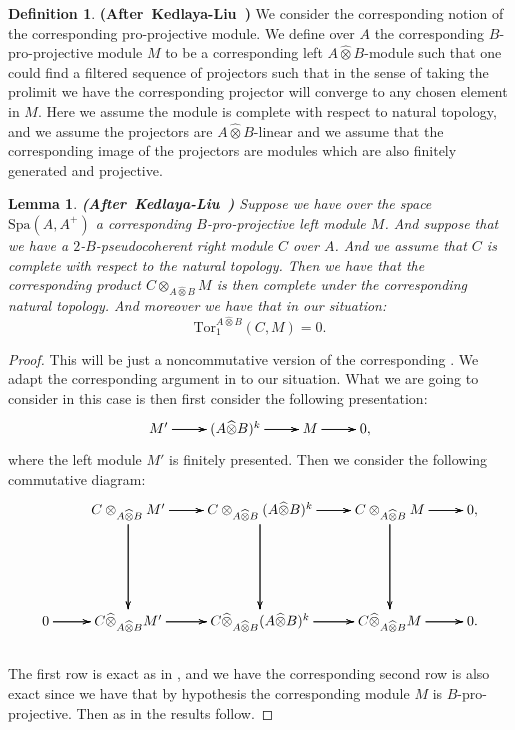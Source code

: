 \documentclass[12pt]{amsart}
\newtheorem{lemma}[theorem]{Lemma}
\theoremstyle{definition}
\newtheorem{definition}[theorem]{Definition}
\numberwithin{equation}{section}
\begin{document}
\begin{definition}\mbox{\bf{(After Kedlaya-Liu \cite[Definition 2.4.6]{KL2})}} We consider the corresponding notion of the corresponding pro-projective module. We define over $A$ the corresponding $B$-pro-projective module $M$ to be a corresponding left $A\widehat{\otimes}B$-module such that one could find a filtered sequence of projectors such that in the sense of taking the prolimit we have the corresponding projector will converge to any chosen element in $M$. Here we assume the module is complete with respect to natural topology, and we assume the projectors are $A\widehat{\otimes}B$-linear and we assume that the corresponding image of the projectors are modules which are also finitely generated and projective.
	
\end{definition}




\begin{lemma}\mbox{\bf{(After Kedlaya-Liu \cite[Lemma 2.4.7]{KL2})}}
Suppose we have over the space $\mathrm{Spa}(A,A^+)$ a corresponding $B$-pro-projective left module $M$. And suppose that we have a $2$-$B$-pseudocoherent right module $C$ over $A$. And we assume that $C$ is complete with respect to the natural topology. Then we have that the corresponding product $C{\otimes}_{A\widehat{\otimes}B}M$ is then complete under the corresponding natural topology. And moreover we have that in our situation:
\begin{displaymath}
\mathrm{Tor}_1^{A\widehat{\otimes}B}(C,M)=0.	
\end{displaymath}

\end{lemma}



\begin{proof}
This will be just a noncommutative version of the corresponding  \cite[Lemma 2.4.7]{KL2}. We adapt the corresponding argument in \cite[Lemma 2.4.7]{KL2} to our situation. What we are going to consider in this case is then first consider the following presentation:
\[
\xymatrix@C+0pc@R+0pc{
M'  \ar[r]\ar[r]\ar[r] &(A\widehat{\otimes}B)^k \ar[r]\ar[r]\ar[r] & M\ar[r]\ar[r]\ar[r] &0,
}
\]
where the left module $M'$ is finitely presented. Then we consider the following commutative diagram:
\[
\xymatrix@C+0pc@R+3pc{
&C\otimes_{A\widehat{\otimes}B}M'  \ar[r]\ar[r]\ar[r]  \ar[d]\ar[d]\ar[d] &C\otimes_{A\widehat{\otimes}B}(A\widehat{\otimes}B)^k \ar[r]\ar[r]\ar[r] \ar[d]\ar[d]\ar[d] & C\otimes_{A\widehat{\otimes}B}M\ar[r]\ar[r]\ar[r] \ar[d]\ar[d]\ar[d] &0,\\
0 \ar[r]\ar[r]\ar[r] &C\widehat{\otimes}_{A\widehat{\otimes}B}M'  \ar[r]\ar[r]\ar[r] &C\widehat{\otimes}_{A\widehat{\otimes}B}(A\widehat{\otimes}B)^k \ar[r]\ar[r]\ar[r] & C\widehat{\otimes}_{A\widehat{\otimes}B}M\ar[r]\ar[r]\ar[r] &0.
}
\]\\
The first row is exact as in \cite[Lemma 2.4.7]{KL2}, and we have the corresponding second row is also exact since we have that by hypothesis the corresponding module $M$ is $B$-pro-projective.  
Then as in \cite[Lemma 2.4.7]{KL2} the results follow.	
\end{proof}
\end{document}
